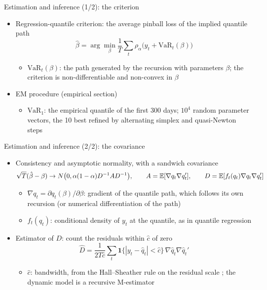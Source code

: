 \begin{frame}{Estimation and inference (1/2): the criterion}
\itemsize{\small}
\begin{itemize}
    \item Regression-quantile criterion: the average pinball loss of the implied quantile path
    \[ \hat\beta = \arg\min_\beta \frac1T\sum_t \rho_\alpha\big(y_t + \mathrm{VaR}_t(\beta)\big) \]
    \begin{itemize}
        \item $\mathrm{VaR}_t(\beta)$: the path generated by the recursion with parameters $\beta$; the criterion is non-differentiable and non-convex in $\beta$
    \end{itemize}
    \item EM procedure (empirical section)
    \begin{itemize}
        \item $\mathrm{VaR}_1$: the empirical quantile of the first 300 days; $10^4$ random parameter vectors, the 10 best refined by alternating simplex and quasi-Newton steps
    \end{itemize}
\end{itemize}
\end{frame}

\begin{frame}{Estimation and inference (2/2): the covariance}
\itemsize{\small}
\begin{itemize}
    \item Consistency and asymptotic normality, with a sandwich covariance
    \[ \sqrt T(\hat\beta - \beta) \to N\big(0, \alpha(1 - \alpha)D^{-1}AD^{-1}\big), \qquad A = \mathbb{E}[\nabla q_t\nabla q_t'], \qquad D = \mathbb{E}[f_t(q_t)\nabla q_t\nabla q_t'] \]
    \begin{itemize}
        \item $\nabla q_t = \partial q_t(\beta)/\partial\beta$: gradient of the quantile path, which follows its own recursion (or numerical differentiation of the path)
        \item $f_t(q_t)$: conditional density of $y_t$ at the quantile, as in quantile regression
    \end{itemize}
    \item Estimator of $D$: count the residuals within $\hat c$ of zero
    \[ \hat D = \frac{1}{2T\hat c}\sum_t\mathbf 1\{|y_t - \hat q_t| < \hat c\}\,\nabla\hat q_t\nabla\hat q_t' \]
    \begin{itemize}
        \item $\hat c$: bandwidth, from the Hall--Sheather rule on the residual scale ; the dynamic model is a recursive M-estimator
    \end{itemize}
\end{itemize}
\end{frame}

